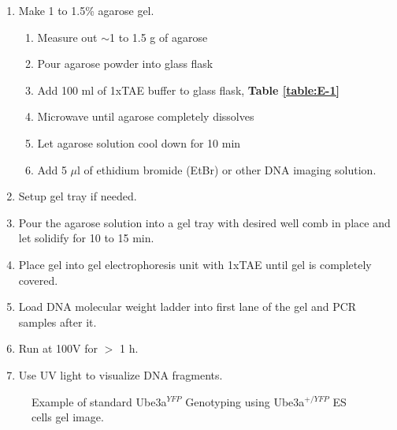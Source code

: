 \begin{enumerate}
\item Make 1 to 1.5\% agarose gel.
  \begin{enumerate}
  \item Measure out $\sim$1 to 1.5 g of agarose
  \item Pour agarose powder into glass flask
  \item Add 100 ml of 1xTAE buffer to glass flask, \textbf{Table \ref{table:E-1}}
  \item Microwave until agarose completely dissolves\footnotemark {}
  \item Let agarose solution cool down for 10 min\footnotemark {}
  \item Add 5 $\mu$l of ethidium bromide (EtBr) or other DNA imaging solution\footnotemark. 
  \end{enumerate}
\item Setup gel tray if needed.
\item Pour the agarose solution into a gel tray with desired well comb in place and let solidify for 10 to 15 min.
\item Place gel into gel electrophoresis unit with 1xTAE until gel is completely covered.
\item Load DNA molecular weight ladder into first lane of the gel and PCR samples after it.
\item Run at 100V for $>$ 1 h.
\item Use UV light to visualize DNA fragments.
\end{enumerate}

\begin{figure}[!ht]
  \centering
  \caption{Example of standard Ube3a$^{YFP}$ Genotyping using Ube3a$^{+/YFP}$ ES cells gel image.}
\end{figure}

